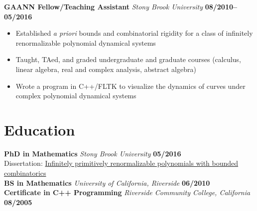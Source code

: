 \documentclass[11pt]{article}
\begin{document}
\vspace{0.5cm}
\noindent\textbf{GAANN Fellow/Teaching Assistant} \emph{Stony Brook University} \hfill \textbf{08/2010--05/2016}
\begin{itemize}
  \itemsep 0em
  \item Established \textit{a priori} bounds and combinatorial rigidity for a class of infinitely renormalizable polynomial dynamical systems
  \item Taught, TAed, and graded undergraduate and graduate courses (calculus, linear algebra, real and complex analysis, abstract algebra)
  \item Wrote a program in C++/FLTK to visualize the dynamics of curves under complex polynomial dynamical systems
\end{itemize}

\section*{Education}
\noindent\textbf{PhD in Mathematics} \emph{Stony Brook University} \hfill \textbf{05/2016}\\
Dissertation: \href{http://hdl.handle.net/11401/76376}{Infinitely primitively renormalizable polynomials with bounded combinatorics}\\
\noindent\textbf{BS in Mathematics} \emph{University of California, Riverside} \hfill \textbf{06/2010}\\
\noindent\textbf{Certificate in C++ Programming} \emph{Riverside Community College, California} \hfill \textbf{08/2005}
\end{document}
